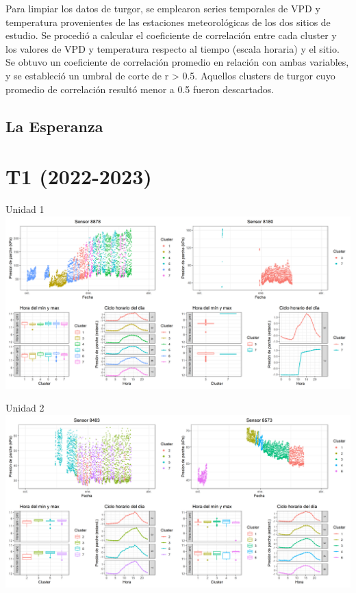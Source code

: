 \documentclass[
  letterpaper,
  DIV=11,
  numbers=noendperiod]{scrreprt}
\begin{document}
Para limpiar los datos de turgor, se emplearon series temporales de VPD
y temperatura provenientes de las estaciones meteorológicas de los dos
sitios de estudio. Se procedió a calcular el coeficiente de correlación
entre cada cluster y los valores de VPD y temperatura respecto al tiempo
(escala horaria) y el sitio. Se obtuvo un coeficiente de correlación
promedio en relación con ambas variables, y se estableció un umbral de
corte de r \textgreater{} 0.5. Aquellos clusters de turgor cuyo promedio
de correlación resultó menor a 0.5 fueron descartados.

\section{La Esperanza}\label{la-esperanza-2}

\chapter{T1 (2022-2023)}

Unidad 1
\includegraphics{figuras/02_turgor_limpiado/2022_2023_La_Esperanza_T1_Unidad_1.png}

Unidad 2
\includegraphics{figuras/02_turgor_limpiado/2022_2023_La_Esperanza_T1_Unidad_2.png}
\end{document}
